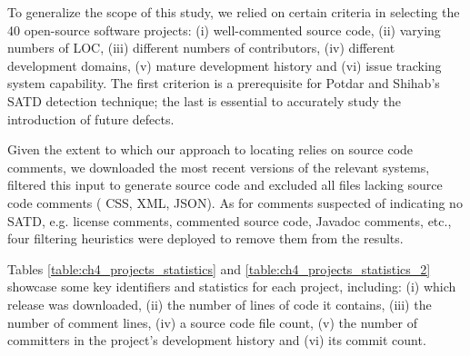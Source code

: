 To generalize the scope of this study, we relied on certain criteria in selecting the 40 open-source software projects: (i) well-commented source code, (ii) varying numbers of LOC, (iii) different numbers of contributors, (iv) different development domains, (v) mature development history and (vi) issue tracking system capability. The first criterion is a prerequisite for Potdar and Shihab's SATD detection technique; the last is essential to accurately study the introduction of future defects.

Given the extent to which our approach to locating \SATD relies on source code comments, we downloaded the most recent versions of the relevant systems, filtered this input to generate source code and excluded all files lacking source code comments (\eg{} CSS, XML, JSON). As for comments suspected of indicating no SATD, e.g. license comments, commented source code, Javadoc comments, etc., four filtering heuristics were deployed to remove them from the results.

Tables \ref{table:ch4_projects_statistics} and \ref{table:ch4_projects_statistics_2} showcase some key identifiers and statistics for each project, including: (i) which release was downloaded, (ii) the number of lines of code it contains, (iii) the number of comment lines, (iv) a source code file count, (v) the number of committers in the project's development history and (vi) its commit count.

